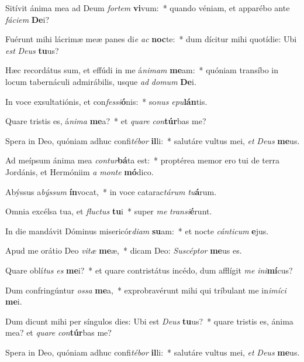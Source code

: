 \item Sitívit ánima mea ad Deum \textit{for}\textit{tem} \textbf{vi}vum:~* quando véniam, et apparébo ante \textit{fá}\textit{ci}\textit{em} \textbf{De}i?
\item Fuérunt mihi lácrimæ meæ panes di\textit{e} \textit{ac} \textbf{noc}te:~* dum dícitur mihi quotídie: Ubi \textit{est} \textit{De}\textit{us} \textbf{tu}us?
\item Hæc recordátus sum, et effúdi in me á\textit{ni}\textit{mam} \textbf{me}am:~* quóniam transíbo in locum tabernáculi admirábilis, usque \textit{ad} \textit{do}\textit{mum} \textbf{De}i.
\item In voce exsultatiónis, et con\textit{fes}\textit{si}\textbf{ó}nis:~* so\textit{nus} \textit{e}\textit{pu}\textbf{lán}tis.
\item Quare tristis es, á\textit{ni}\textit{ma} \textbf{me}a?~* et \textit{qua}\textit{re} \textit{con}\textbf{túr}bas me?
\item Spera in Deo, quóniam adhuc confi\textit{té}\textit{bor} \textbf{il}li:~* salutáre vultus mei, \textit{et} \textit{De}\textit{us} \textbf{me}us.
\item Ad meípsum ánima mea \textit{con}\textit{tur}\textbf{bá}ta est:~* proptérea memor ero tui de terra Jordánis, et Hermóniim \textit{a} \textit{mon}\textit{te} \textbf{mó}dico.
\item Abýssus a\textit{býs}\textit{sum} \textbf{ín}vocat,~* in voce catarac\textit{tá}\textit{rum} \textit{tu}\textbf{á}rum.
\item Omnia excélsa tua, et \textit{fluc}\textit{tus} \textbf{tu}i~* super \textit{me} \textit{trans}\textit{i}\textbf{é}runt.
\item In die mandávit Dóminus misericór\textit{di}\textit{am} \textbf{su}am:~* et nocte \textit{cán}\textit{ti}\textit{cum} \textbf{e}jus.
\item Apud me orátio Deo \textit{vi}\textit{tæ} \textbf{me}æ,~* dicam Deo: \textit{Su}\textit{scép}\textit{tor} \textbf{me}us es.
\item Quare oblí\textit{tus} \textit{es} \textbf{me}i?~* et quare contristátus incédo, dum afflígit \textit{me} \textit{in}\textit{i}\textbf{mí}cus?
\item Dum confringúntur \textit{os}\textit{sa} \textbf{me}a,~* exprobravérunt mihi qui tríbulant me in\textit{i}\textit{mí}\textit{ci} \textbf{me}i.
\item Dum dicunt mihi per síngulos dies: Ubi est \textit{De}\textit{us} \textbf{tu}us?~* quare tristis es, ánima mea? et \textit{qua}\textit{re} \textit{con}\textbf{túr}bas me?
\item Spera in Deo, quóniam adhuc confi\textit{té}\textit{bor} \textbf{il}li:~* salutáre vultus mei, \textit{et} \textit{De}\textit{us} \textbf{me}us.
